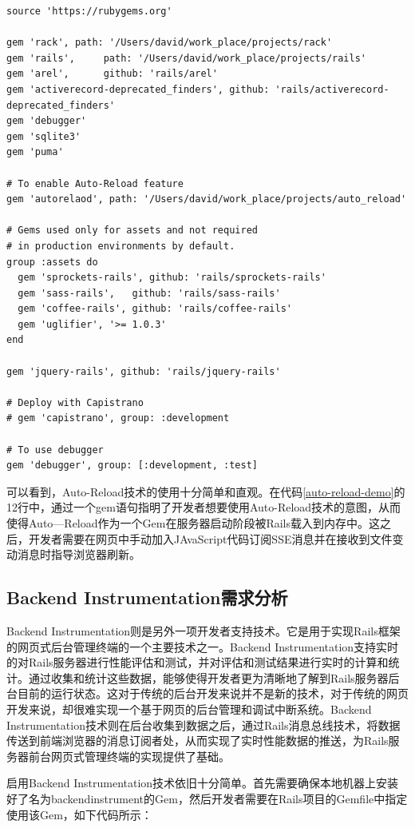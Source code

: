 \begin{lstlisting}[caption={启用Auto-Realod技术}, label=auto-reload-demo]
source 'https://rubygems.org'

gem 'rack', path: '/Users/david/work_place/projects/rack'
gem 'rails',     path: '/Users/david/work_place/projects/rails'
gem 'arel',      github: 'rails/arel'
gem 'activerecord-deprecated_finders', github: 'rails/activerecord-deprecated_finders'
gem 'debugger'
gem 'sqlite3'
gem 'puma'

# To enable Auto-Reload feature
gem 'autorelaod', path: '/Users/david/work_place/projects/auto_reload'

# Gems used only for assets and not required
# in production environments by default.
group :assets do
  gem 'sprockets-rails', github: 'rails/sprockets-rails'
  gem 'sass-rails',   github: 'rails/sass-rails'
  gem 'coffee-rails', github: 'rails/coffee-rails'
  gem 'uglifier', '>= 1.0.3'
end

gem 'jquery-rails', github: 'rails/jquery-rails'

# Deploy with Capistrano
# gem 'capistrano', group: :development

# To use debugger
gem 'debugger', group: [:development, :test]
\end{lstlisting}

可以看到，Auto-Reload技术的使用十分简单和直观。在代码\ref{auto-reload-demo}的12行中，通过一个gem语句指明了开发者想要使用Auto-Reload技术的意图，从而使得Auto—Reload作为一个Gem在服务器启动阶段被Rails载入到内存中。这之后，开发者需要在网页中手动加入JAvaScript代码订阅SSE消息并在接收到文件变动消息时指导浏览器刷新。

\subsection{Backend Instrumentation需求分析}

Backend Instrumentation则是另外一项开发者支持技术。它是用于实现Rails框架的网页式后台管理终端的一个主要技术之一。Backend Instrumentation支持实时的对Rails服务器进行性能评估和测试，并对评估和测试结果进行实时的计算和统计。通过收集和统计这些数据，能够使得开发者更为清晰地了解到Rails服务器后台目前的运行状态。这对于传统的后台开发来说并不是新的技术，对于传统的网页开发来说，却很难实现一个基于网页的后台管理和调试中断系统。Backend Instrumentation技术则在后台收集到数据之后，通过Rails消息总线技术，将数据传送到前端浏览器的消息订阅者处，从而实现了实时性能数据的推送，为Rails服务器前台网页式管理终端的实现提供了基础。

启用Backend Instrumentation技术依旧十分简单。首先需要确保本地机器上安装好了名为backendinstrument的Gem，然后开发者需要在Rails项目的Gemfile中指定使用该Gem，如下代码所示：

